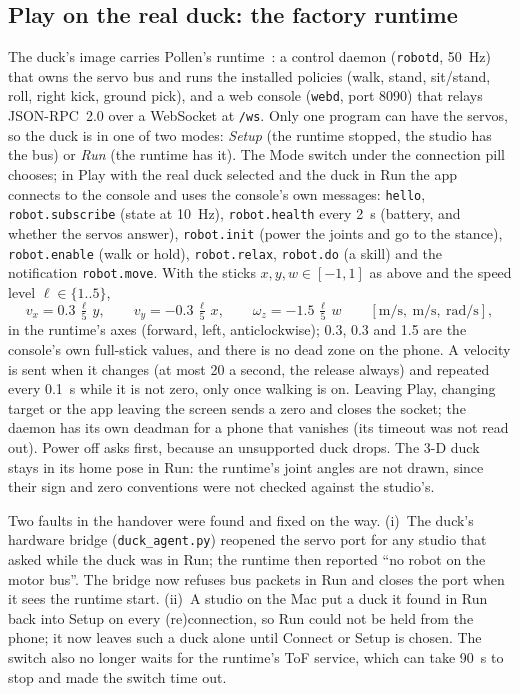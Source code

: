 \documentclass[11pt]{article}
\begin{document}
\subsection{Play on the real duck: the factory runtime}\label{sec:runtime}
The duck's image carries Pollen's runtime~\cite{pollen}: a control daemon (\texttt{robotd}, 50~Hz) that owns the
servo bus and runs the installed policies (walk, stand, sit/stand, roll, right kick, ground pick), and a web console
(\texttt{webd}, port 8090) that relays JSON-RPC~2.0 over a WebSocket at \texttt{/ws}. Only one program can have the
servos, so the duck is in one of two modes: \emph{Setup} (the runtime stopped, the studio has the bus) or \emph{Run}
(the runtime has it). The Mode switch under the connection pill chooses; in Play with the real duck selected and
the duck in Run the app connects to the console and uses the console's own messages: \texttt{hello}, \texttt{robot.subscribe} (state at
10~Hz), \texttt{robot.health} every 2~s (battery, and whether the servos answer), \texttt{robot.init} (power the
joints and go to the stance), \texttt{robot.enable} (walk or hold), \texttt{robot.relax}, \texttt{robot.do} (a
skill) and the notification \texttt{robot.move}. With the sticks $x, y, w \in [-1,1]$ as above and the speed level
$\ell \in \{1..5\}$,
\begin{equation}
v_x = 0.3\,\tfrac{\ell}{5}\,y,\qquad v_y = -0.3\,\tfrac{\ell}{5}\,x,\qquad \omega_z = -1.5\,\tfrac{\ell}{5}\,w
\qquad [\mathrm{m/s},\ \mathrm{m/s},\ \mathrm{rad/s}],
\end{equation}
in the runtime's axes (forward, left, anticlockwise); 0.3, 0.3 and 1.5 are the console's own full-stick values, and
there is no dead zone on the phone. A velocity is sent when it changes (at most 20 a second, the release always)
and repeated every 0.1~s while it is not zero, only once walking is on. Leaving Play, changing target or the app
leaving the screen sends a zero and closes the socket; the daemon has its own deadman for a phone that vanishes
(its timeout was not read out). Power off asks first, because an unsupported duck drops. The 3-D duck stays in its
home pose in Run: the runtime's joint angles are not drawn, since their sign and zero conventions were not checked
against the studio's.

Two faults in the handover were found and fixed on the way. (i)~The duck's hardware bridge
(\texttt{duck\_agent.py}) reopened the servo port for any studio that asked while the duck was in Run; the
runtime then reported ``no robot on the motor bus''. The bridge now refuses bus packets in Run and closes the port
when it sees the runtime start. (ii)~A studio on the Mac put a duck it found in Run back into Setup on every
(re)connection, so Run could not be held from the phone; it now leaves such a duck alone until Connect or Setup is
chosen. The switch also no longer waits for the runtime's ToF service, which can take 90~s to stop and made the
switch time out.
\end{document}
